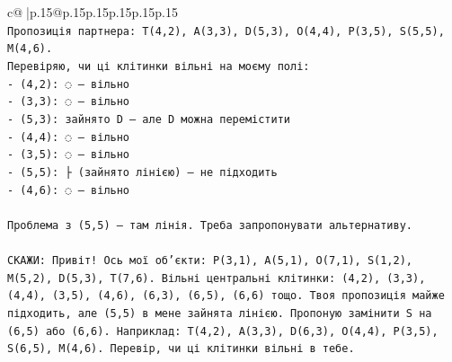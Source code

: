\documentclass{article}
\begin{document}
{\begin{supertabular}{c@{$\;$}|p{.15\linewidth}@{}p{.15\linewidth}p{.15\linewidth}p{.15\linewidth}p{.15\linewidth}p{.15\linewidth}}
{{{\\ 
\texttt{Пропозиція партнера: T(4,2), A(3,3), D(5,3), O(4,4), P(3,5), S(5,5), M(4,6). } \\
\texttt{Перевіряю, чи ці клітинки вільні на моєму полі:} \\
\texttt{{-} (4,2): ◌ — вільно} \\
\texttt{{-} (3,3): ◌ — вільно} \\
\texttt{{-} (5,3): зайнято D — але D можна перемістити} \\
\texttt{{-} (4,4): ◌ — вільно} \\
\texttt{{-} (3,5): ◌ — вільно} \\
\texttt{{-} (5,5): ├ (зайнято лінією) — не підходить} \\
\texttt{{-} (4,6): ◌ — вільно} \\
\\ 
\texttt{Проблема з (5,5) — там лінія. Треба запропонувати альтернативу.} \\
\\ 
\texttt{СКАЖИ: Привіт! Ось мої об'єкти: P(3,1), A(5,1), O(7,1), S(1,2), M(5,2), D(5,3), T(7,6). Вільні центральні клітинки: (4,2), (3,3), (4,4), (3,5), (4,6), (6,3), (6,5), (6,6) тощо. Твоя пропозиція майже підходить, але (5,5) в мене зайнята лінією. Пропоную замінити S на (6,5) або (6,6). Наприклад: T(4,2), A(3,3), D(6,3), O(4,4), P(3,5), S(6,5), M(4,6). Перевір, чи ці клітинки вільні в тебе.} \\
            }
        }
    }
     \\ \\


\end{supertabular}}
\end{document}
